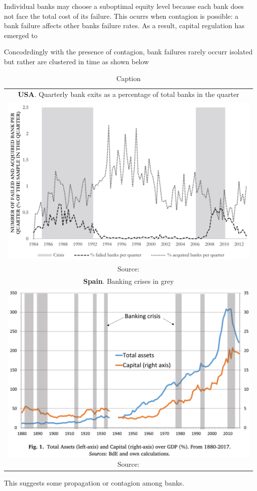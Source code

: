 \documentclass[11pt,final]{article}%
\begin{document}
Individual banks may choose a suboptimal equity level because each bank does not face the total cost of its failure. This ocurrs when contagion is possible: a bank failure affects other banks failure rates.  As a result, capital regulation has emerged to 

Concodrdingly with the presence of contagion, bank failures rarely occurr isolated but rather are clustered in time as shown below

\begin{table}[]
    \centering
    \begin{tabular}{c}
         \textbf{USA}. Quarterly bank exits as a percentage of total banks in the quarter \\
         \includegraphics[width=\textwidth]{graphs/USA_Spokeviciute Keasey V Bank exits.png} \\
         Source: \cite{SpokeviciuteKeaseyVallascas2019} \\
        \addlinespace
          \textbf{Spain}. Banking crises in grey \\
         \includegraphics[width=\textwidth]{graphs/Spain banking crises.png}
          Source: \cite{BedayoEstradaSaurina2020} \\
    \end{tabular}
    \caption{Caption}
    \label{tab:my_label}
\end{table}
This suggests some propagation or contagion among banks.
\end{document}
